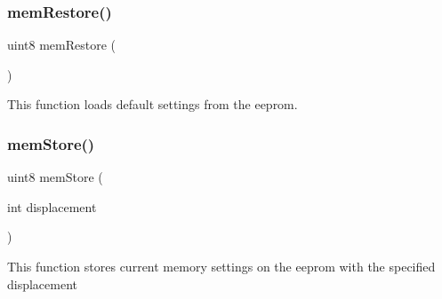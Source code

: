 \subsubsection{mem\+Restore()}
{\footnotesize\ttfamily uint8 mem\+Restore (\begin{DoxyParamCaption}{ }\end{DoxyParamCaption})}

This function loads default settings from the eeprom. \mbox{\label{command__processing_8c_a81e6b73c0ee52661736a97c08bdb262b}} 
\subsubsection{mem\+Store()}
{\footnotesize\ttfamily uint8 mem\+Store (\begin{DoxyParamCaption}\item[{int}]{displacement }\end{DoxyParamCaption})}

This function stores current memory settings on the eeprom with the specified displacement 